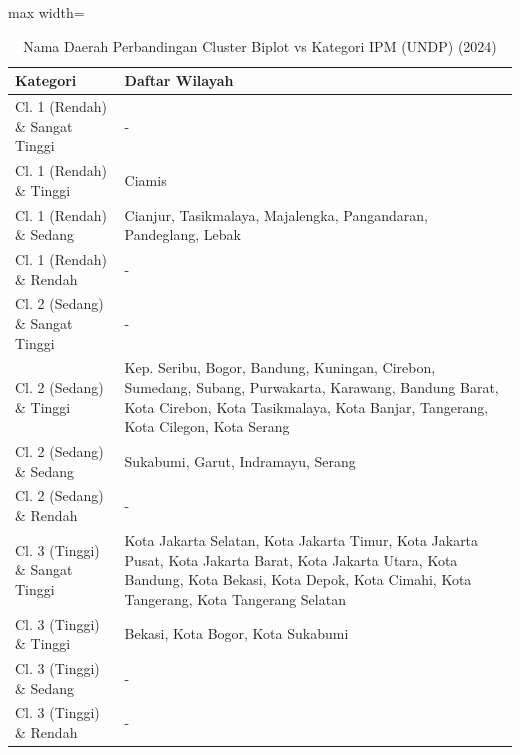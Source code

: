 \begin{table}[H]
\centering
\caption{Nama Daerah Perbandingan Cluster Biplot vs Kategori IPM (UNDP) (2024)} \label{tab:appcrossname2024}
\begin{adjustbox}{max width=\textwidth}
\begin{tabular}{|p{4cm}|p{10cm}|}
\hline
\textbf{Kategori} & \textbf{Daftar Wilayah} \\
\hline
Cl. 1 (Rendah) \& Sangat Tinggi & - \\
\hline
Cl. 1 (Rendah) \& Tinggi & Ciamis \\
\hline
Cl. 1 (Rendah) \& Sedang & Cianjur, Tasikmalaya, Majalengka, Pangandaran, Pandeglang, Lebak \\
\hline
Cl. 1 (Rendah) \& Rendah & - \\
\hline
Cl. 2 (Sedang) \& Sangat Tinggi & - \\
\hline
Cl. 2 (Sedang) \& Tinggi & Kep. Seribu, Bogor, Bandung, Kuningan, Cirebon, Sumedang, Subang, Purwakarta, Karawang, Bandung Barat, Kota Cirebon, Kota Tasikmalaya, Kota Banjar, Tangerang, Kota Cilegon, Kota Serang \\
\hline
Cl. 2 (Sedang) \& Sedang & Sukabumi, Garut, Indramayu, Serang \\
\hline
Cl. 2 (Sedang) \& Rendah & - \\
\hline
Cl. 3 (Tinggi) \& Sangat Tinggi & Kota Jakarta Selatan, Kota Jakarta Timur, Kota Jakarta Pusat, Kota Jakarta Barat, Kota Jakarta Utara, Kota Bandung, Kota Bekasi, Kota Depok, Kota Cimahi, Kota Tangerang, Kota Tangerang Selatan \\
\hline
Cl. 3 (Tinggi) \& Tinggi & Bekasi, Kota Bogor, Kota Sukabumi \\
\hline
Cl. 3 (Tinggi) \& Sedang & - \\
\hline
Cl. 3 (Tinggi) \& Rendah & - \\
\hline
\end{tabular}
\end{adjustbox}
\end{table}